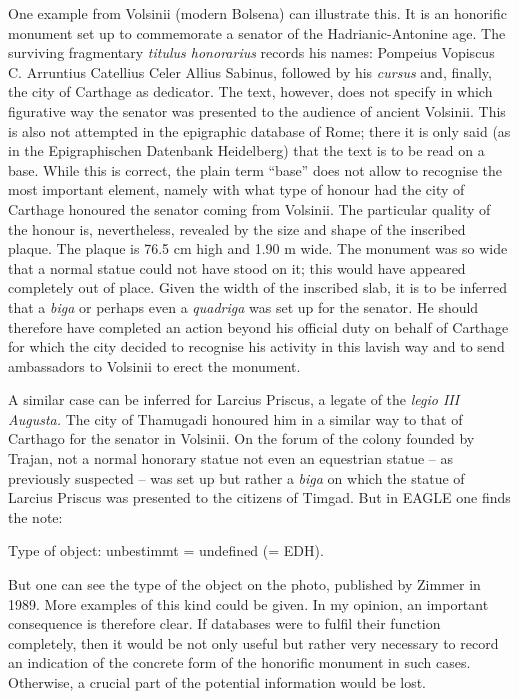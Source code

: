 \documentclass{article}
\begin{document}
One example from Volsinii (modern Bolsena) can illustrate this. It is an honorific 
monument set up to commemorate a senator of the Hadrianic-Antonine age. The surviving 
fragmentary \textit{titulus honorarius }records his names: Pompeius Vopiscus C. 
Arruntius Catellius Celer Allius Sabinus, followed by his \textit{cursus }and, 
finally, the city of Carthage as dedicator. The text, however, does not specify 
in which figurative way the senator was presented to the audience of ancient Volsinii. 
This is also not attempted in the epigraphic database of Rome; there it is only 
said (as in the Epigraphischen Datenbank Heidelberg) that the text is to be read 
on a base. While this is correct, the plain term ``base'' does not allow to recognise 
the most important element, namely with what type of honour had the city of Carthage 
honoured the senator coming from Volsinii. The particular quality of the honour 
is, nevertheless, revealed by the size and shape of the inscribed plaque. The plaque 
is 76.5 cm high and 1.90 m wide. The monument was so wide that a normal statue 
could not have stood on it; this would have appeared completely out of place. Given 
the width of the inscribed slab, it is to be inferred that a \textit{biga }or perhaps 
even a \textit{quadriga} was set up for the senator\textit{.} He should therefore 
have completed an action beyond his official duty on behalf of Carthage for which 
the city decided to recognise his activity in this lavish way and to send ambassadors 
to Volsinii to erect the monument.      

A similar case can be inferred for Larcius Priscus, a legate of the \textit{legio 
III Augusta.} The city of Thamugadi honoured him in a similar way to that of Carthago 
for the senator in Volsinii. On the forum of the colony founded by Trajan, not 
a normal honorary statue not even an equestrian statue – as previously suspected 
– was set up but rather a \textit{biga }on which the statue of Larcius Priscus 
was presented to the citizens of Timgad. But in EAGLE one finds the note: 

Type of object: unbestimmt = undefined (= EDH). 

But one can see the type of the object on the photo, published by Zimmer in 1989. 
More examples of this kind could be given. In my opinion, an important consequence 
is therefore clear. If databases were to fulfil their function completely, then 
it would be not only useful but rather very necessary to record an indication of 
the concrete form of the honorific monument in such cases. Otherwise, a crucial 
part of the potential information would be lost.  
\end{document}
